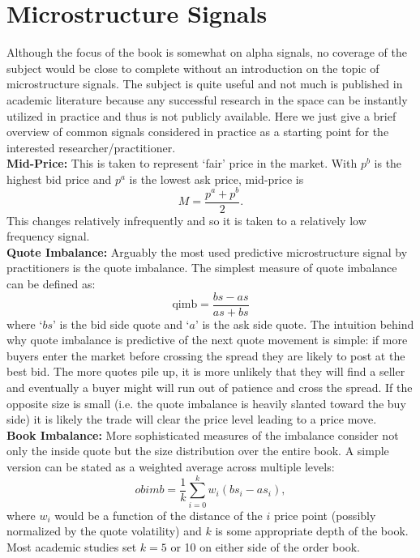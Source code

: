 \section{Microstructure Signals }

Although the focus of the book is somewhat on alpha signals, no coverage of the subject would be close to complete without an introduction on the topic of microstructure signals. The subject is quite useful and not much is published in academic literature because any successful research in the space can be instantly utilized in practice and thus is not publicly available. Here we just give a brief overview of common signals considered in practice as a starting point for the interested researcher/practitioner. \\


\noindent\textbf{Mid-Price:} This is taken to represent `fair' price in the market. With $p^b$ is the highest bid price and $p^a$ is the lowest ask price, mid-price is
	\begin{equation} \label{eqn:mpapbover2}
	M= \dfrac{p^a + p^b}{2}.
	\end{equation}
This changes relatively infrequently and so it is taken to a relatively low frequency signal. \\


\noindent\textbf{Quote Imbalance:} Arguably the most used predictive microstructure signal by practitioners is the quote imbalance.  The simplest measure of quote imbalance can be defined as: 
	\begin{equation}\label{eq:q_imb}
		\text{qimb} = \frac{bs - as}{as + bs}
	\end{equation}
where `$bs$' is the bid side quote and `$a$' is the ask side quote. The intuition behind why quote imbalance is predictive of the next quote movement is simple: if more buyers enter the market before crossing the spread they are likely to post at the best bid. The more quotes pile up, it is more unlikely that they will find a seller and eventually a buyer might will run out of patience and cross the spread. If the opposite size is small (i.e. the quote imbalance is heavily slanted toward the buy side) it is likely the trade will clear the price level leading to a price move. \\


\noindent\textbf{Book Imbalance:} More sophisticated measures of the imbalance consider not only the inside quote but the size distribution over the entire book. A simple version can be stated as a weighted average across multiple levels:
	\begin{equation}\label{eq:microprc}
		obimb = \frac{1}{k}\sum_{i=0}^k w_i (bs_i-  as_i),
	\end{equation}
where $w_i$ would be a function of the distance of the $i$ price point (possibly normalized by the quote volatility) and $k$ is some appropriate depth of the book. Most academic studies set $k=5$ or 10 on either side of the order book. \\


